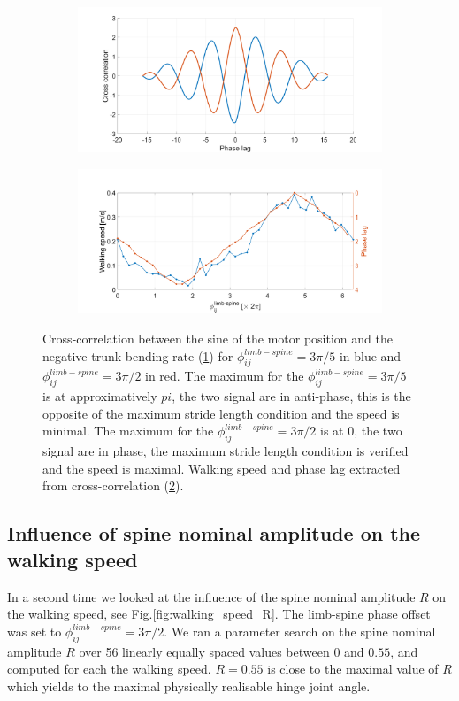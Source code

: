 \documentclass[a4paper]{scrartcl}
\begin{document}
{\begin{figure}
 \centering
 \begin{subfigure}[b]{\linewidth}
  \centering
  \includegraphics[width=\textwidth]{Figures/figure2Ca.png}
  \caption{\label{fig:corr_ex}}
 \end{subfigure}
 \begin{subfigure}[b]{\linewidth}
  \centering
  \includegraphics[width=\textwidth]{Figures/figure2Cb.png}
  \caption{\label{fig:corr_speed}}
 \end{subfigure}
 \caption{\label{fig:corr} Cross-correlation between the sine of the motor position and the negative trunk bending rate (\ref{fig:corr_ex}) for $\phi_{ij}^{limb-spine} = 3\pi/5$ in blue and $\phi_{ij}^{limb-spine} = 3\pi/2$ in red. The maximum for the $\phi_{ij}^{limb-spine} = 3\pi/5$ is at approximatively $pi$, the two signal are in anti-phase, this is the opposite of the maximum stride length condition and the speed is minimal. The maximum for the $\phi_{ij}^{limb-spine} = 3\pi/2$ is at $0$, the two signal are in phase, the maximum stride length condition is verified and the speed is maximal. Walking speed and phase lag extracted from cross-correlation (\ref{fig:corr_speed}).}
\end{figure}

\subsection*{Influence of spine nominal amplitude on the walking speed}
In a second time we looked at the influence of the spine nominal amplitude $R$ on the walking speed, see Fig.\ref{fig:walking_speed_R}. The limb-spine phase offset was set to $\phi_{ij}^{limb-spine} = 3\pi/2$. We ran a parameter search on the spine nominal amplitude $R$ over 56 linearly equally spaced values between $0$ and $0.55$, and computed for each the walking speed. $R = 0.55$ is close to the maximal value of $R$ which yields to the maximal physically realisable hinge joint angle.

}
\end{document}

